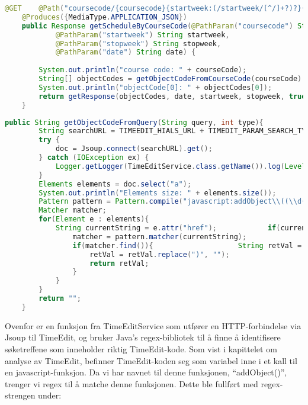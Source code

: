 \documentclass[../main.tex]{subfiles}
\begin{document}
\begin{lstlisting}[language=Java, frame=single, caption={asdasdsadasdasdasdsadsadasdasdsadsa}]
@GET    @Path("coursecode/{coursecode}{startweek:(/startweek/[^/]+?)?}{stopweek:(/stopweek/[^/]+?)?}{date:(/date/[^/]+?)?}")
    @Produces({MediaType.APPLICATION_JSON})
    public Response getScheduleByCourseCode(@PathParam("coursecode") String courseCode,
            @PathParam("startweek") String startweek,
            @PathParam("stopweek") String stopweek,
            @PathParam("date") String date) {
        
        System.out.println("course code: " + courseCode);
        String[] objectCodes = getObjectCodeFromCourseCode(courseCode).split("/");
        System.out.println("objectCode[0]: " + objectCodes[0]);
        return getResponse(objectCodes, date, startweek, stopweek, true);
    }
\end{lstlisting}

\begin{lstlisting}[language=Java, frame=single, caption={asdasdsadasdasdasdsadsadasdasdsadsa}]
public String getObjectCodeFromQuery(String query, int type){
        String searchURL = TIMEEDIT_HIALS_URL + TIMEDIT_PARAM_SEARCH_TYPE + "=" + type + "&" + TIMEDIT_PARAM_SEARCH + "=" + query;        Document doc = null;
        try {
            doc = Jsoup.connect(searchURL).get();
        } catch (IOException ex) {
            Logger.getLogger(TimeEditService.class.getName()).log(Level.SEVERE, null, ex);
        }
        Elements elements = doc.select("a");
        System.out.println("Elements size: " + elements.size());
        Pattern pattern = Pattern.compile("javascript:addObject\\((\\d{6}|\\d{7})\\)");
        Matcher matcher;
        for(Element e : elements){
            String currentString = e.attr("href");            if(currentString != null && !currentString.isEmpty()){
                matcher = pattern.matcher(currentString);
                if(matcher.find()){                    String retVal = matcher.group().replace("javascript:addObject(", "");
                    retVal = retVal.replace(")", "");
                    return retVal;
                }
            }
        }
        return "";
    }
\end{lstlisting}

Ovenfor er en funksjon fra TimeEditService som utfører en HTTP-forbindelse via Jsoup til TimeEdit, og bruker Java’s regex-bibliotek til å finne å identifisere søketreffene som inneholder riktig TimeEdit-kode. Som vist i kapittelet om analyse av TimeEdit, befinner TimeEdit-koden seg som variabel inne i et kall til en javascript-funksjon. Da vi har navnet til denne funksjonen, “addObject()”, trenger vi regex til å matche denne funksjonen. Dette ble fullført med regex-strengen under:
\end{document}
